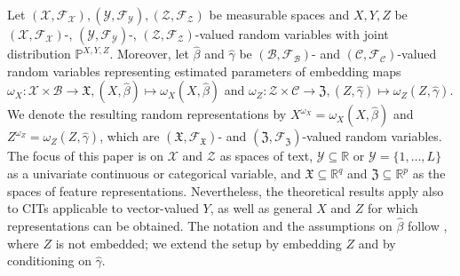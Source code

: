 \documentclass[twoside,11pt]{article}
\begin{document}
Let $(\mathcal{X}, \mathcal{F}_\mathcal{X}), (\mathcal{Y}, \mathcal{F}_\mathcal{Y}), (\mathcal{Z}, \mathcal{F}_\mathcal{Z})$ be measurable spaces and $X,Y,Z$ be $(\mathcal{X}, \mathcal{F}_\mathcal{X})$-, $(\mathcal{Y}, \mathcal{F}_\mathcal{Y})$-, $(\mathcal{Z}, \mathcal{F}_\mathcal{Z})$-valued random variables with joint distribution $\mathbb{P}^{X,Y,Z}$. Moreover, let $\hat{\beta}$ and $\hat{\gamma}$ be $(\mathcal{B},\mathcal{F}_{\mathcal{B}})$- and $(\mathcal{C},\mathcal{F}_{\mathcal{C}})$-valued random variables representing estimated parameters of embedding maps $\omega_X:\mathcal{X}\times \mathcal{B}\to \mathfrak{X},(X,\hat{\beta})\mapsto \omega_X(X,\hat{\beta})$ and $\omega_Z:\mathcal{Z}\times \mathcal{C}\to \mathfrak{Z},(Z,\hat{\gamma})\mapsto \omega_Z(Z,\hat{\gamma})$. 
We denote the resulting random representations by $X^{\omega_X}=\omega_X(X,\hat{\beta})$ and $Z^{\omega_Z}=\omega_Z(Z,\hat{\gamma})$, which are $(\mathfrak{X},\mathcal{F}_\mathfrak{X})$- and $(\mathfrak{Z},\mathcal{F}_\mathfrak{Z})$-valued random variables.
The focus of this paper is on $\mathcal{X}$ and $\mathcal{Z}$ as spaces of text,  $\mathcal{Y}\subseteq\mathbb{R}$ or $\mathcal{Y}=\{1,\ldots,L\}$ as a univariate continuous or categorical variable, and $\mathfrak{X}\subseteq \mathbb{R}^q$ and $\mathfrak{Z}\subseteq \mathbb{R}^p$ as the spaces of feature representations. Nevertheless, the theoretical results apply also to CITs applicable to vector-valued $Y$, as well as general $X$ and $Z$ for which representations can be obtained. 
The notation and the assumptions on $\hat\beta$ follow \citet{simnacher2026deep}, where $Z$ is not embedded; we extend the setup by embedding $Z$ and by conditioning on $\hat\gamma$.
\end{document}
